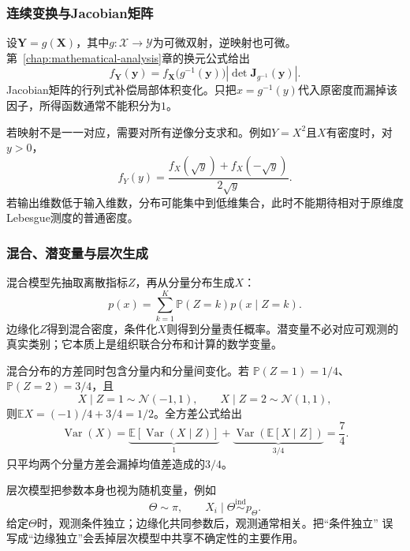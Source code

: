 \subsubsection{连续变换与Jacobian矩阵}

设\(\bm{Y}=g(\bm{X})\)，其中\(g:\mathcal{X}\to\mathcal{Y}\)为可微双射，逆映射也可微。第~\ref{chap:mathematical-analysis}章的换元公式给出
\begin{equation}
  f_{\bm{Y}}(\bm{y})
  =
  f_{\bm{X}}\bigl(g^{-1}(\bm{y})\bigr)
  \left|
    \det\bm{J}_{g^{-1}}(\bm{y})
  \right|.
  \label{eq:probability-density-change-variables}
\end{equation}
Jacobian矩阵的行列式补偿局部体积变化。只把\(x=g^{-1}(y)\)代入原密度而漏掉该因子，所得函数通常不能积分为\(1\)。

若映射不是一一对应，需要对所有逆像分支求和。例如\(Y=X^2\)且\(X\)有密度时，对\(y>0\)，
\[ f_Y(y)
  =\frac{f_X(\sqrt{y})+f_X(-\sqrt{y})}{2\sqrt{y}}. \]
若输出维数低于输入维数，分布可能集中到低维集合，此时不能期待相对于原维度Lebesgue测度的普通密度。

\subsubsection{混合、潜变量与层次生成}

混合模型先抽取离散指标\(Z\)，再从分量分布生成\(X\)：
\[ p(x)=\sum_{k=1}^{K}\mathbb{P}(Z=k)p(x\mid Z=k). \]
边缘化\(Z\)得到混合密度，条件化\(X\)则得到分量责任概率。潜变量不必对应可观测的真实类别；它本质上是组织联合分布和计算的数学变量。

混合分布的方差同时包含分量内和分量间变化。若
\(\mathbb{P}(Z=1)=1/4\)、\(\mathbb{P}(Z=2)=3/4\)，且
\[
  X\mid Z=1\sim\mathcal{N}(-1,1),\qquad
  X\mid Z=2\sim\mathcal{N}(1,1),
\]
则\(\mathbb{E}X=(-1)/4+3/4=1/2\)。全方差公式给出
\[
  \operatorname{Var}(X)
  =\underbrace{\mathbb{E}[\operatorname{Var}(X\mid Z)]}_{1}
   +\underbrace{\operatorname{Var}(\mathbb{E}[X\mid Z])}_{3/4}
  =\frac74.
\]
只平均两个分量方差会漏掉均值差造成的\(3/4\)。

层次模型把参数本身也视为随机变量，例如
\[ \Theta\sim\pi,\qquad
  X_i\mid\Theta\mathrel{\overset{\mathrm{ind}}{\sim}}p_\Theta. \]
给定\(\Theta\)时，观测条件独立；边缘化共同参数后，观测通常相关。把“条件独立”
误写成“边缘独立”会丢掉层次模型中共享不确定性的主要作用。

